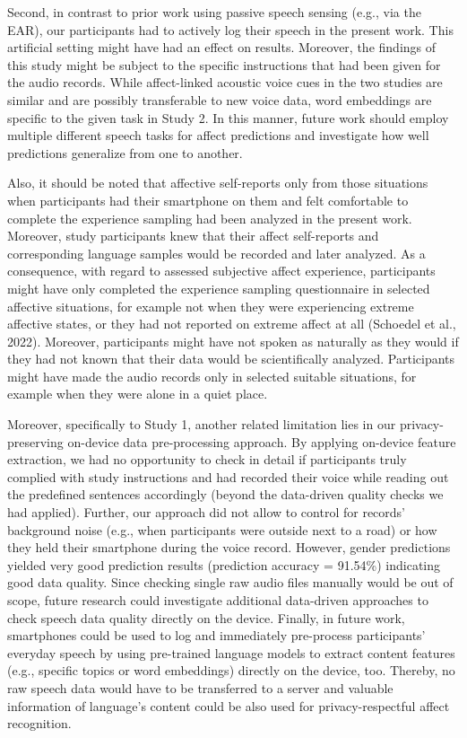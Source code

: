 \documentclass[
  english,
  man,floatsintext]{apa6}
\begin{document}
Second, in contrast to prior work using passive speech sensing (e.g., via the EAR), our participants had to actively log their speech in the present work. This artificial setting might have had an effect on results. Moreover, the findings of this study might be subject to the specific instructions that had been given for the audio records. While affect-linked acoustic voice cues in the two studies are similar and are possibly transferable to new voice data, word embeddings are specific to the given task in Study 2. In this manner, future work should employ multiple different speech tasks for affect predictions and investigate how well predictions generalize from one to another.

Also, it should be noted that affective self-reports only from those situations when participants had their smartphone on them and felt comfortable to complete the experience sampling had been analyzed in the present work. Moreover, study participants knew that their affect self-reports and corresponding language samples would be recorded and later analyzed. As a consequence, with regard to assessed subjective affect experience, participants might have only completed the experience sampling questionnaire in selected affective situations, for example not when they were experiencing extreme affective states, or they had not reported on extreme affect at all (Schoedel et al., 2022). Moreover, participants might have not spoken as naturally as they would if they had not known that their data would be scientifically analyzed. Participants might have made the audio records only in selected suitable situations, for example when they were alone in a quiet place.

Moreover, specifically to Study 1, another related limitation lies in our privacy-preserving on-device data pre-processing approach. By applying on-device feature extraction, we had no opportunity to check in detail if participants truly complied with study instructions and had recorded their voice while reading out the predefined sentences accordingly (beyond the data-driven quality checks we had applied). Further, our approach did not allow to control for records' background noise (e.g., when participants were outside next to a road) or how they held their smartphone during the voice record. However, gender predictions yielded very good prediction results (prediction accuracy = 91.54\%) indicating good data quality. Since checking single raw audio files manually would be out of scope, future research could investigate additional data-driven approaches to check speech data quality directly on the device. Finally, in future work, smartphones could be used to log and immediately pre-process participants' everyday speech by using pre-trained language models to extract content features (e.g., specific topics or word embeddings) directly on the device, too. Thereby, no raw speech data would have to be transferred to a server and valuable information of language's content could be also used for privacy-respectful affect recognition.
\end{document}
